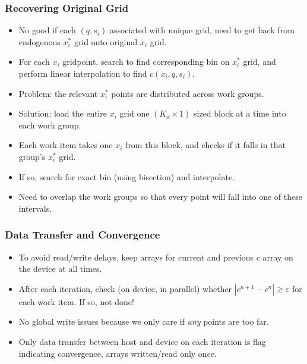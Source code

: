 \documentclass[handout]{beamer}
\newcommand{\eps}{\varepsilon}
\theoremstyle{definition}
\begin{document}
\begin{frame}
  \frametitle{Recovering Original Grid}
  \begin{itemize}[<+->]
  \item No good if each $(q, s_i)$ associated with unique grid, need to get back from endogenous $x_i^*$ grid onto original $x_i$ grid.
  \item For each $x_i$ gridpoint, search to find corresponding bin on $x_i^*$ grid, and perform linear interpolation to find $c(x_i, q, s_i)$.
  \item Problem: the relevant $x_i^*$ points are distributed across work groups.
  \item Solution: load the entire $x_i$ grid one $(K_x \times 1)$ sized block at a time into each work group.
  \item Each work item takes one $x_i$ from this block, and checks if it falls in that group's $x_i^*$ grid.
  \item If so, search for exact bin (using bisection) and interpolate.
  \item Need to overlap the work groups so that every point will fall into one of these intervals.
  \end{itemize}
\end{frame}

\begin{frame}
  \frametitle{Data Transfer and Convergence}
  \begin{itemize}[<+->]
  \item To avoid read/write delays, keep arrays for current and previous $c$ array on the device at all times.
  \item After each iteration, check (on device, in parallel) whether $| c^{n+1} - c^n | \ge \eps$ for each work item. If so, not done!
  \item No global write issues because we only care if \emph{any} points are too far.
  \item Only data transfer between host and device on each iteration is flag indicating convergence, arrays written/read only once.
  \end{itemize}
\end{frame}
\end{document}
